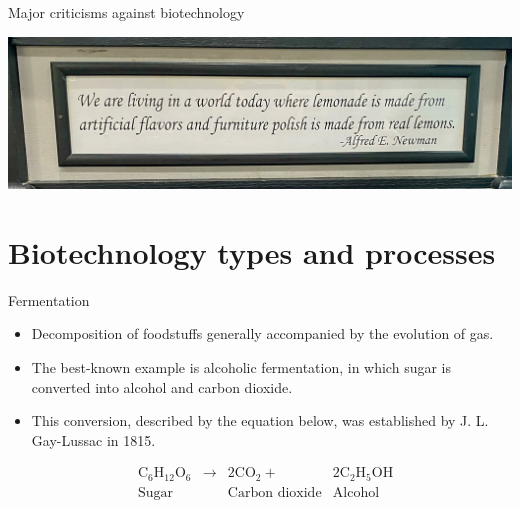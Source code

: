 \documentclass[
  ignorenonframetext,
  aspectratio=169]{beamer}
\providecommand{\tightlist}{%
  \setlength{\itemsep}{0pt}\setlength{\parskip}{0pt}}
\begin{document}
\begin{frame}{Major criticisms against biotechnology}
\protect\hypertarget{major-criticisms-against-biotechnology}{}
\begin{center}\includegraphics[width=0.98\linewidth]{../images/living_in_chemical_world} \end{center}
\end{frame}

\hypertarget{biotechnology-types-and-processes}{%
\section{Biotechnology types and
processes}\label{biotechnology-types-and-processes}}

\begin{frame}{Fermentation}
\protect\hypertarget{fermentation}{}
\begin{itemize}
\tightlist
\item
  Decomposition of foodstuffs generally accompanied by the evolution of
  gas.
\item
  The best-known example is alcoholic fermentation, in which sugar is
  converted into alcohol and carbon dioxide.
\item
  This conversion, described by the equation below, was established by
  J. L. Gay-Lussac in 1815.
\end{itemize}

\[
\begin{aligned}
&\mathrm{C_6 H_{12} O_6} &\longrightarrow &\mathrm{2CO_2} + &\mathrm{2C_2H_5OH} \\
&\textrm{Sugar} &&\textrm{Carbon dioxide} &\textrm{Alcohol}
\end{aligned}
\]
\end{frame}
\end{document}
